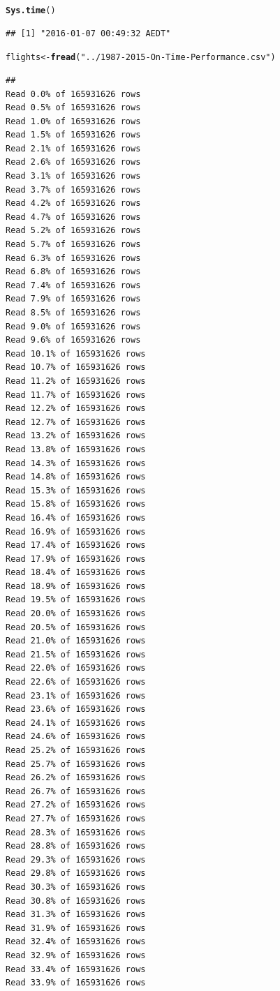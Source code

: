 \documentclass{scrreprt}\usepackage[]{graphicx}\usepackage[]{color}
\makeatletter
\newcommand{\hlstr}[1]{\textcolor[rgb]{0.192,0.494,0.8}{#1}}%
\newcommand{\hlstd}[1]{\textcolor[rgb]{0.345,0.345,0.345}{#1}}%
\newcommand{\hlkwb}[1]{\textcolor[rgb]{0.69,0.353,0.396}{#1}}%
\newcommand{\hlkwd}[1]{\textcolor[rgb]{0.737,0.353,0.396}{\textbf{#1}}}%
\newenvironment{kframe}{%
 \def\at@end@of@kframe{}%
 \ifinner\ifhmode%
  \def\at@end@of@kframe{\end{minipage}}%
  \begin{minipage}{\columnwidth}%
 \fi\fi%
 \def\FrameCommand##1{\hskip\@totalleftmargin \hskip-\fboxsep
 \colorbox{shadecolor}{##1}\hskip-\fboxsep
     \hskip-\linewidth \hskip-\@totalleftmargin \hskip\columnwidth}%
 \MakeFramed {\advance\hsize-\width
   \@totalleftmargin\z@ \linewidth\hsize
   \@setminipage}}%
 {\par\unskip\endMakeFramed%
 \at@end@of@kframe}
\newenvironment{knitrout}{}{} %
\makeatother
\begin{document}
\begin{knitrout}
\color{fgcolor}\begin{kframe}
\begin{alltt}
\hlkwd{Sys.time}\hlstd{()}
\end{alltt}
\begin{verbatim}
## [1] "2016-01-07 00:49:32 AEDT"
\end{verbatim}
\begin{alltt}
\hlstd{flights} \hlkwb{<-} \hlkwd{fread}\hlstd{(}\hlstr{"../1987-2015-On-Time-Performance.csv"}\hlstd{)}
\end{alltt}
\begin{verbatim}
## 
Read 0.0% of 165931626 rows
Read 0.5% of 165931626 rows
Read 1.0% of 165931626 rows
Read 1.5% of 165931626 rows
Read 2.1% of 165931626 rows
Read 2.6% of 165931626 rows
Read 3.1% of 165931626 rows
Read 3.7% of 165931626 rows
Read 4.2% of 165931626 rows
Read 4.7% of 165931626 rows
Read 5.2% of 165931626 rows
Read 5.7% of 165931626 rows
Read 6.3% of 165931626 rows
Read 6.8% of 165931626 rows
Read 7.4% of 165931626 rows
Read 7.9% of 165931626 rows
Read 8.5% of 165931626 rows
Read 9.0% of 165931626 rows
Read 9.6% of 165931626 rows
Read 10.1% of 165931626 rows
Read 10.7% of 165931626 rows
Read 11.2% of 165931626 rows
Read 11.7% of 165931626 rows
Read 12.2% of 165931626 rows
Read 12.7% of 165931626 rows
Read 13.2% of 165931626 rows
Read 13.8% of 165931626 rows
Read 14.3% of 165931626 rows
Read 14.8% of 165931626 rows
Read 15.3% of 165931626 rows
Read 15.8% of 165931626 rows
Read 16.4% of 165931626 rows
Read 16.9% of 165931626 rows
Read 17.4% of 165931626 rows
Read 17.9% of 165931626 rows
Read 18.4% of 165931626 rows
Read 18.9% of 165931626 rows
Read 19.5% of 165931626 rows
Read 20.0% of 165931626 rows
Read 20.5% of 165931626 rows
Read 21.0% of 165931626 rows
Read 21.5% of 165931626 rows
Read 22.0% of 165931626 rows
Read 22.6% of 165931626 rows
Read 23.1% of 165931626 rows
Read 23.6% of 165931626 rows
Read 24.1% of 165931626 rows
Read 24.6% of 165931626 rows
Read 25.2% of 165931626 rows
Read 25.7% of 165931626 rows
Read 26.2% of 165931626 rows
Read 26.7% of 165931626 rows
Read 27.2% of 165931626 rows
Read 27.7% of 165931626 rows
Read 28.3% of 165931626 rows
Read 28.8% of 165931626 rows
Read 29.3% of 165931626 rows
Read 29.8% of 165931626 rows
Read 30.3% of 165931626 rows
Read 30.8% of 165931626 rows
Read 31.3% of 165931626 rows
Read 31.9% of 165931626 rows
Read 32.4% of 165931626 rows
Read 32.9% of 165931626 rows
Read 33.4% of 165931626 rows
Read 33.9% of 165931626 rows

\end{verbatim}
\end{kframe}
\end{knitrout}
\end{document}
